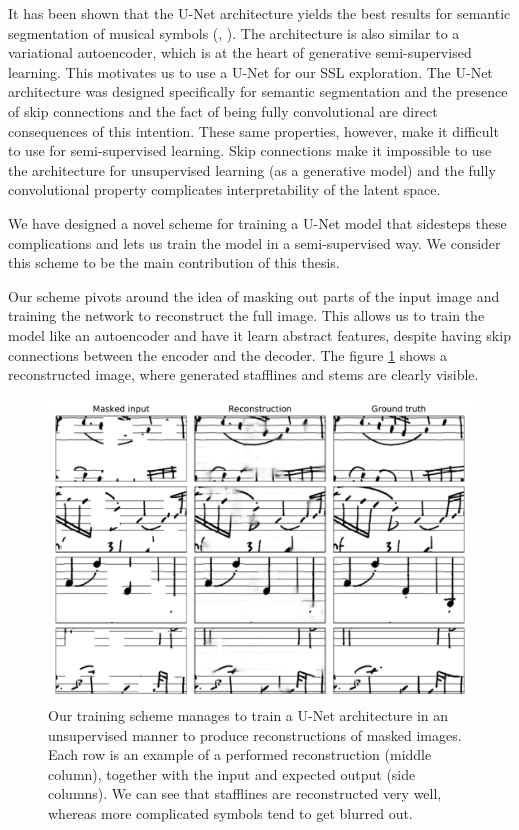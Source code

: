 It has been shown that the U-Net architecture yields the best results for semantic segmentation of musical symbols (\cite{UNet}, \cite{PachaBaseline}). The architecture is also similar to a variational autoencoder, which is at the heart of generative semi-supervised learning. This motivates us to use a U-Net for our SSL exploration. The U-Net architecture was designed specifically for semantic segmentation and the presence of skip connections and the fact of being fully convolutional are direct consequences of this intention. These same properties, however, make it difficult to use for semi-supervised learning. Skip connections make it impossible to use the architecture for unsupervised learning (as a generative model) and the fully convolutional property complicates interpretability of the latent space.

We have designed a novel scheme for training a U-Net model that sidesteps these complications and lets us train the model in a semi-supervised way. We consider this scheme to be the main contribution of this thesis.

Our scheme pivots around the idea of masking out parts of the input image and training the network to reconstruct the full image. This allows us to train the model like an autoencoder and have it learn abstract features, despite having skip connections between the encoder and the decoder. The figure \ref{fig:Reconstructions} shows a reconstructed image, where generated stafflines and stems are clearly visible.

\begin{figure}[ht]
    \centering
    \includegraphics[width=145mm]{../../figures/06-noise/reconstructions.pdf}
    \caption{Our training scheme manages to train a U-Net architecture in an unsupervised manner to produce reconstructions of masked images. Each row is an example of a performed reconstruction (middle column), together with the input and expected output (side columns). We can see that stafflines are reconstructed very well, whereas more complicated symbols tend to get blurred out.}
    \label{fig:Reconstructions}
\end{figure}

